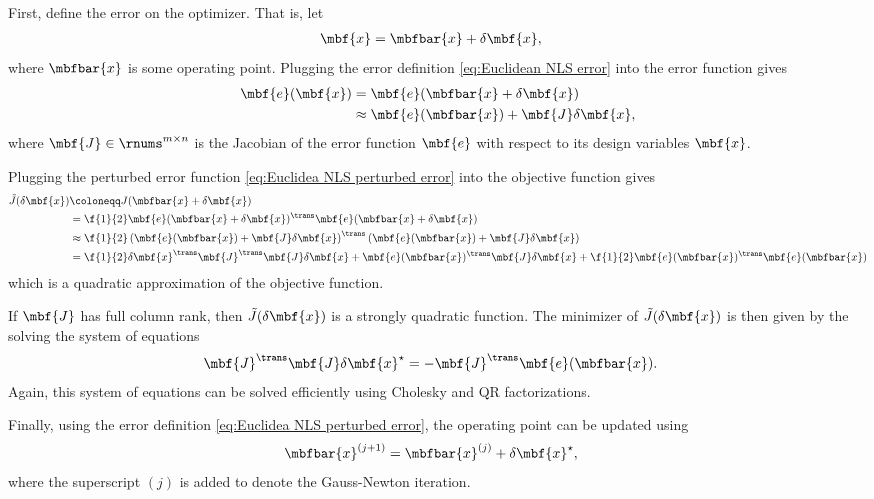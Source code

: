 \documentclass[ nobib, nofonts, notoc]{tufte-handout}
\begin{document}
    First, define the error on the optimizer. That is, let
    \begin{align}
        \label{eq:Euclidean NLS error}
        \mbf{x} &= \mbfbar{x} + \delta\mbf{x},
    \end{align}
    where $\mbfbar{x}$ is some operating point. Plugging the error definition \eqref{eq:Euclidean NLS error} into the error function gives
    \begin{align}
        \mbf{e}(\mbf{x}) &= \mbf{e}(\mbfbar{x} +\delta\mbf{x})\\
        \label{eq:Euclidea NLS perturbed error}
        &\approx \mbf{e}(\mbfbar{x}) + \mbf{J}\delta\mbf{x},
    \end{align}
    where $\mbf{J}\in\rnums^{m\times n}$ is the Jacobian of the error function $\mbf{e}$ with respect to its design variables $\mbf{x}$.

    Plugging the perturbed error function \eqref{eq:Euclidea NLS perturbed error} into the objective function gives 
    \begin{align}
        \tilde{J}(\delta\mbf{x}) &\coloneqq J(\mbfbar{x} + \delta\mbf{x})\\
        &= \f{1}{2}\mbf{e}(\mbfbar{x} + \delta\mbf{x})^{\trans}\mbf{e}(\mbfbar{x} + \delta\mbf{x})\\
        &\approx
        \f{1}{2}\left( \mbf{e}(\mbfbar{x}) + \mbf{J}\delta\mbf{x} \right)^{\trans} \left( \mbf{e}(\mbfbar{x}) + \mbf{J}\delta\mbf{x} \right)\\
        &= \f{1}{2}\delta\mbf{x}^{\trans}\mbf{J}^{\trans}\mbf{J}\delta\mbf{x} + \mbf{e}(\mbfbar{x})^{\trans}\mbf{J}\delta\mbf{x} + \f{1}{2}\mbf{e}(\mbfbar{x})^{\trans}\mbf{e}(\mbfbar{x})
    \end{align}
    which is a quadratic approximation of the objective function.

    If $\mbf{J}$ has full column rank, then $\tilde{J}(\delta\mbf{x})$ is a strongly quadratic function. The minimizer of $\tilde{J}(\delta\mbf{x})$ is then given by the solving the system of equations
    \begin{align}
        \mbf{J}^{\trans}\mbf{J}\delta\mbf{x}^{\star} &= -\mbf{J}^{\trans}\mbf{e}(\mbfbar{x}).
    \end{align}
    Again, this system of equations can be solved efficiently using Cholesky and QR factorizations.

    Finally, using the error definition \eqref{eq:Euclidea NLS perturbed error}, the operating point can be updated using
    \begin{align}
        \mbfbar{x}^{(j+1)} &= \mbfbar{x}^{(j)} + \delta\mbf{x}^{\star},
    \end{align}
    where the superscript $(j)$ is added to denote the Gauss-Newton iteration.
\end{document}
